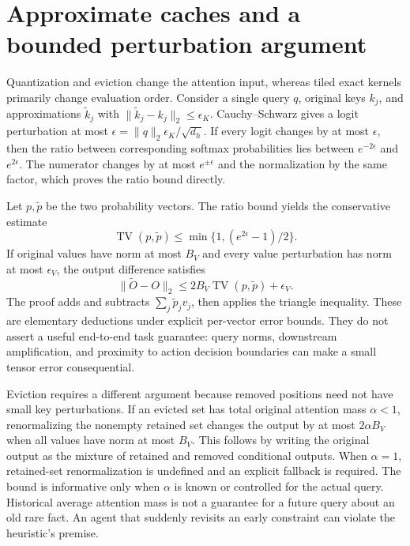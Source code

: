 \section{Approximate caches and a bounded perturbation argument}
\label{sec:C04:approximation}
Quantization and eviction change the attention input, whereas tiled exact kernels primarily change evaluation order. Consider a single query $q$, original keys $k_j$, and approximations $\widetilde k_j$ with $\|\widetilde k_j-k_j\|_2\leq\epsilon_K$. Cauchy--Schwarz gives a logit perturbation at most $\epsilon=\|q\|_2\epsilon_K/\sqrt{d_h}$. If every logit changes by at most $\epsilon$, then the ratio between corresponding softmax probabilities lies between $e^{-2\epsilon}$ and $e^{2\epsilon}$. The numerator changes by at most $e^{\pm\epsilon}$ and the normalization by the same factor, which proves the ratio bound directly.

Let $p,\widetilde p$ be the two probability vectors. The ratio bound yields the conservative estimate
\begin{equation}
 \operatorname{TV}(p,\widetilde p)
 \leq \min\{1,(e^{2\epsilon}-1)/2\}.
\end{equation}
If original values have norm at most $B_V$ and every value perturbation has norm at most $\epsilon_V$, the output difference satisfies
\begin{equation}
 \|\widetilde O-O\|_2
 \leq2B_V\operatorname{TV}(p,\widetilde p)+\epsilon_V.
\end{equation}
The proof adds and subtracts $\sum_j\widetilde p_jv_j$, then applies the triangle inequality. These are elementary deductions under explicit per-vector error bounds. They do not assert a useful end-to-end task guarantee: query norms, downstream amplification, and proximity to action decision boundaries can make a small tensor error consequential.

Eviction requires a different argument because removed positions need not have small key perturbations. If an evicted set has total original attention mass $\alpha<1$, renormalizing the nonempty retained set changes the output by at most $2\alpha B_V$ when all values have norm at most $B_V$. This follows by writing the original output as the mixture of retained and removed conditional outputs. When $\alpha=1$, retained-set renormalization is undefined and an explicit fallback is required. The bound is informative only when $\alpha$ is known or controlled for the actual query. Historical average attention mass is not a guarantee for a future query about an old rare fact. An agent that suddenly revisits an early constraint can violate the heuristic's premise.

